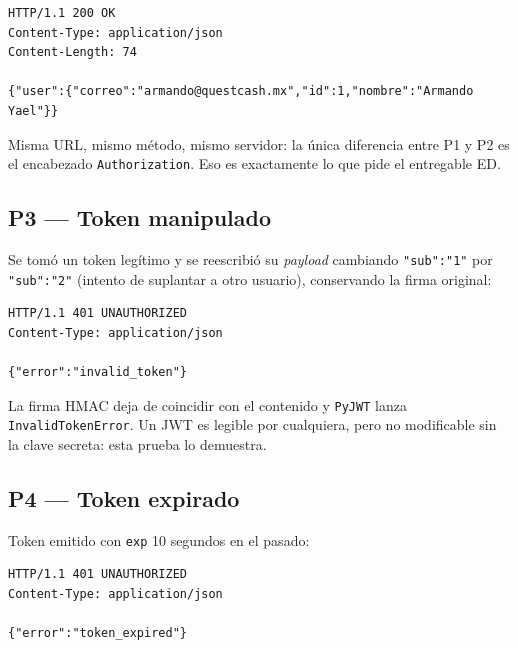 \documentclass[11pt,letterpaper]{article}
\begin{document}
\begin{consola}[title={\$ curl -i http://127.0.0.1:5001/api/v1/auth/me -H "Authorization: Bearer \$TOKEN"}]
\begin{lstlisting}[style=terminal]
HTTP/1.1 200 OK
Content-Type: application/json
Content-Length: 74

{"user":{"correo":"armando@questcash.mx","id":1,"nombre":"Armando Yael"}}
\end{lstlisting}
\end{consola}

\noindent Misma URL, mismo método, mismo servidor: la única diferencia entre P1 y P2 es el
encabezado \texttt{Authorization}. Eso es exactamente lo que pide el entregable ED.

\subsection{P3 — Token manipulado}

Se tomó un token legítimo y se reescribió su \emph{payload} cambiando \texttt{"sub":"1"} por
\texttt{"sub":"2"} (intento de suplantar a otro usuario), conservando la firma original:

\begin{consola}[title={\$ curl -i /api/v1/auth/me -H "Authorization: Bearer <payload alterado>"}]
\begin{lstlisting}[style=terminal]
HTTP/1.1 401 UNAUTHORIZED
Content-Type: application/json

{"error":"invalid_token"}
\end{lstlisting}
\end{consola}

\noindent La firma HMAC deja de coincidir con el contenido y \texttt{PyJWT} lanza
\texttt{InvalidTokenError}. Un JWT es legible por cualquiera, pero no modificable sin la
clave secreta: esta prueba lo demuestra.

\subsection{P4 — Token expirado}

Token emitido con \texttt{exp} 10 segundos en el pasado:

\begin{consola}[title={\$ curl -i /api/v1/auth/me -H "Authorization: Bearer <token vencido>"}]
\begin{lstlisting}[style=terminal]
HTTP/1.1 401 UNAUTHORIZED
Content-Type: application/json

{"error":"token_expired"}
\end{lstlisting}
\end{consola}
\end{document}

